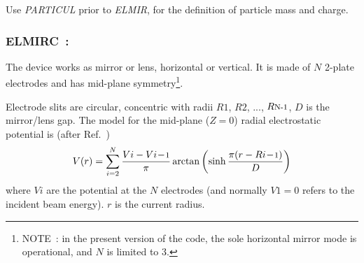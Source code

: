 {\medskip

\noindent Use \textsl{PARTICUL} prior to \textsl{ELMIR}, for the
 definition of particle mass and charge.

\bigskip
\vfill

\begin{figure}[H]
\centerline{}
\hangcaption{\label{figELMIR} \CapELMIR}
\end{figure}

\vfill

\newpage

\subsubsection*{ELMIRC~: \ELMIRCTitl~\cite{Karets}}\label{ELMIRC}
\medskip

The device works as  mirror or lens, horizontal or vertical. 
It is made of $N$ 2-plate electrodes and has mid-plane 
symmetry\footnote{NOTE~: in the present version of the code, the sole horizontal mirror mode 
 is operational, and $N$ is limited to 3.}. 

\medskip

\noindent Electrode  slits are circular, concentric with  radii  $ R1 $, $ R2 $, ...,   
$ R{\textrm{\footnotesize N-1}}$, 
$D$ is the  mirror/lens gap. The model for the mid-plane ($Z=0$) radial electrostatic potential  
is (after Ref.~\cite[p.443]{Karets})
$$ V(r) = 
   \sum_{i=2}^{N} \dfrac{V{i}-V{i\!-\!\textrm{\footnotesize 1}} }{ \pi} 
     \arctan \left( \sinh \dfrac{ \pi ( r - R{i\!-\!\textrm{\footnotesize 1}})}{D} \right)  
$$
where $V\!i$ are the potential at the $N$ electrodes (and normally $V\!1=0$ refers to
the incident beam energy). $r$ is the current radius. 

}

